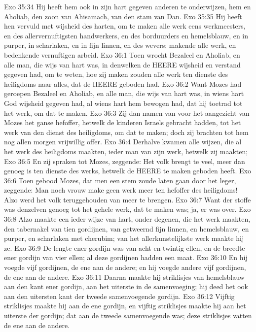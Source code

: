 Exo 35:34  Hij heeft hem ook in zijn hart gegeven anderen te onderwijzen, hem en Aholiab, den zoon van Ahisamach, van den stam van Dan.
Exo 35:35  Hij heeft hen vervuld met wijsheid des harten, om te maken alle werk eens werkmeesters, en des allervernuftigsten handwerkers, en des borduurders en hemelsblauw, en in purper, in scharlaken, en in fijn linnen, en des wevers; makende alle werk, en bedenkende vernuftigen arbeid.
Exo 36:1  Toen wrocht Bezaleel en Aholiab, en alle man, die wijs van hart was, in denwelken de HEERE wijsheid en verstand gegeven had, om te weten, hoe zij maken zouden alle werk ten dienste des heiligdoms naar alles, dat de HEERE geboden had.
Exo 36:2  Want Mozes had geroepen Bezaleel en Aholiab, en alle man, die wijs van hart was, in wiens hart God wijsheid gegeven had, al wiens hart hem bewogen had, dat hij toetrad tot het werk, om dat te maken.
Exo 36:3  Zij dan namen van voor het aangezicht van Mozes het ganse hefoffer, hetwelk de kinderen Israels gebracht hadden, tot het werk van den dienst des heiligdoms, om dat te maken; doch zij brachten tot hem nog allen morgen vrijwillig offer.
Exo 36:4  Derhalve kwamen alle wijzen, die al het werk des heiligdoms maakten, ieder man van zijn werk, hetwelk zij maakten;
Exo 36:5  En zij spraken tot Mozes, zeggende: Het volk brengt te veel, meer dan genoeg is ten dienste des werks, hetwelk de HEERE te maken geboden heeft.
Exo 36:6  Toen gebood Mozes, dat men een stem zoude laten gaan door het leger, zeggende: Man noch vrouw make geen werk meer ten hefoffer des heiligdoms! Alzo werd het volk teruggehouden van meer te brengen.
Exo 36:7  Want der stoffe was denzelven genoeg tot het gehele werk, dat te maken was; ja, er was over.
Exo 36:8  Alzo maakte een ieder wijze van hart, onder degenen, die het werk maakten, den tabernakel van tien gordijnen, van getweernd fijn linnen, en hemelsblauw, en purper, en scharlaken met cherubim; van het allerkunstelijkste werk maakte hij ze.
Exo 36:9  De lengte ener gordijn was van acht en twintig ellen, en de breedte ener gordijn van vier ellen; al deze gordijnen hadden een maat.
Exo 36:10  En hij voegde vijf gordijnen, de ene aan de andere; en hij voegde andere vijf gordijnen, de ene aan de andere.
Exo 36:11  Daarna maakte hij striklisjes van hemelsblauw aan den kant ener gordijn, aan het uiterste in de samenvoeging; hij deed het ook aan den uitersten kant der tweede samenvoegende gordijn.
Exo 36:12  Vijftig striklisjes maakte hij aan de ene gordijn, en vijftig striklisjes maakte hij aan het uiterste der gordijn; dat aan de tweede samenvoegende was; deze striklisjes vatten de ene aan de andere.
